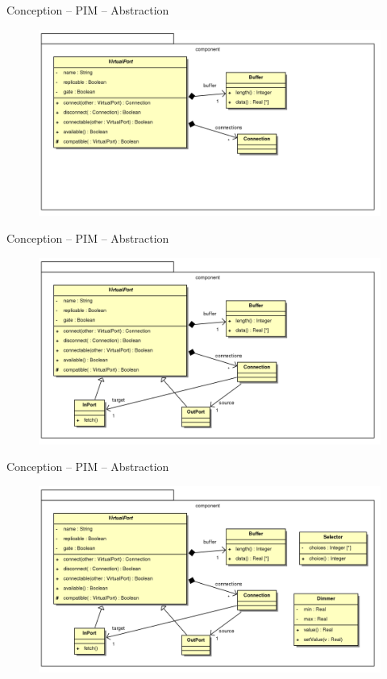 \documentclass[frenchb]{beamer}
\begin{document}
\begin{frame}{Conception -- PIM -- Abstraction}
    \begin{figure}
        \includegraphics[width=12cm ]{../img/ps/business-pim-part2-3.pdf}
    \end{figure}
\end{frame}

\begin{frame}{Conception -- PIM -- Abstraction}
    \begin{figure}
        \includegraphics[width=12cm ]{../img/ps/business-pim-part2-4.pdf}
    \end{figure}
\end{frame}

\begin{frame}{Conception -- PIM -- Abstraction}
    \begin{figure}
        \includegraphics[width=12cm ]{../img/ps/business-pim-part2-5.pdf}
    \end{figure}
\end{frame}
\end{document}
